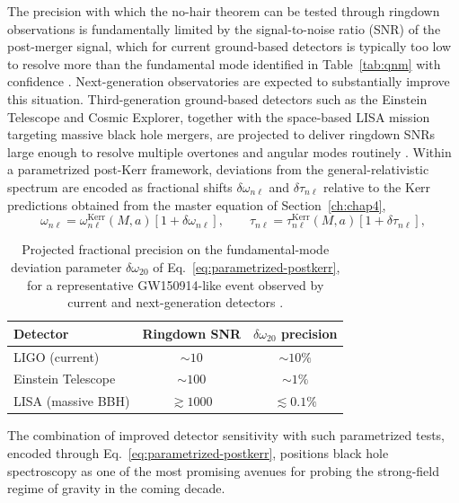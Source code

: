
The precision with which the no-hair theorem can be tested through ringdown observations is fundamentally limited by the signal-to-noise ratio (SNR) of the post-merger signal, which for current ground-based detectors is typically too low to resolve more than the fundamental mode identified in Table~\ref{tab:qnm} with confidence \cite{berti2009}. Next-generation observatories are expected to substantially improve this situation. Third-generation ground-based detectors such as the Einstein Telescope and Cosmic Explorer, together with the space-based LISA mission targeting massive black hole mergers, are projected to deliver ringdown SNRs large enough to resolve multiple overtones and angular modes routinely \cite{berti2016}.
Within a parametrized post-Kerr framework, deviations from the general-relativistic spectrum are encoded as fractional shifts $\delta\omega_{n\ell}$ and $\delta\tau_{n\ell}$ relative to the Kerr predictions obtained from the master equation of Section~\ref{ch:chap4},
\begin{equation}
	\omega_{n\ell} = \omega_{n\ell}^{\mathrm{Kerr}}(M,a)\left[1 + \delta\omega_{n\ell}\right], \qquad
	\tau_{n\ell} = \tau_{n\ell}^{\mathrm{Kerr}}(M,a)\left[1 + \delta\tau_{n\ell}\right],
	\label{eq:parametrized-postkerr}
\end{equation}
\begin{table}[H]
	\centering
	\caption{Projected fractional precision on the fundamental-mode deviation parameter $\delta\omega_{20}$ of Eq.~\eqref{eq:parametrized-postkerr}, for a representative GW150914-like event observed by current and next-generation detectors \cite{berti2016}.}
	\label{tab:snr-forecast}
	\begin{tabular}{lcc}
		\hline
		\textbf{Detector} & \textbf{Ringdown SNR} & \textbf{$\delta\omega_{20}$ precision} \\
		\hline
		LIGO (current) \cite{isi2019} & $\sim 10$ & $\sim 10\%$ \\
		Einstein Telescope \cite{berti2016} & $\sim 100$ & $\sim 1\%$ \\
		LISA (massive BBH) \cite{berti2016} & $\gtrsim 1000$ & $\lesssim 0.1\%$ \\
		\hline
	\end{tabular}
\end{table}

The combination of improved detector sensitivity with such parametrized tests, encoded through Eq.~\eqref{eq:parametrized-postkerr}, positions black hole spectroscopy as one of the most promising avenues for probing the strong-field regime of gravity in the coming decade.